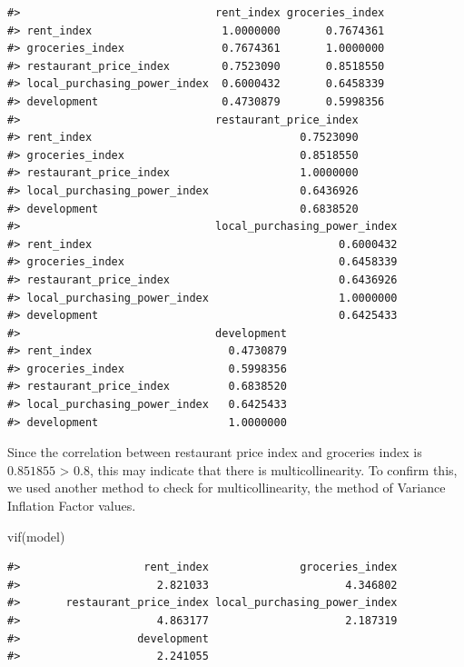 \documentclass[
  11pt,
  a4paper,
  twoside]{scrbook}
\newenvironment{Shaded}{\begin{snugshade}}{\end{snugshade}}
\newcommand{\FunctionTok}[1]{\textcolor[rgb]{0.00,0.00,0.00}{#1}}
\newcommand{\NormalTok}[1]{#1}
\begin{document}
\begin{verbatim}
#>                              rent_index groceries_index
#> rent_index                    1.0000000       0.7674361
#> groceries_index               0.7674361       1.0000000
#> restaurant_price_index        0.7523090       0.8518550
#> local_purchasing_power_index  0.6000432       0.6458339
#> development                   0.4730879       0.5998356
#>                              restaurant_price_index
#> rent_index                                0.7523090
#> groceries_index                           0.8518550
#> restaurant_price_index                    1.0000000
#> local_purchasing_power_index              0.6436926
#> development                               0.6838520
#>                              local_purchasing_power_index
#> rent_index                                      0.6000432
#> groceries_index                                 0.6458339
#> restaurant_price_index                          0.6436926
#> local_purchasing_power_index                    1.0000000
#> development                                     0.6425433
#>                              development
#> rent_index                     0.4730879
#> groceries_index                0.5998356
#> restaurant_price_index         0.6838520
#> local_purchasing_power_index   0.6425433
#> development                    1.0000000
\end{verbatim}

Since the correlation between restaurant price index and groceries index is
\(0.851855\) \textgreater{} 0.8, this may indicate that there is multicollinearity. To confirm this, we used another method to check for multicollinearity, the method of Variance Inflation Factor values.

\linespread{1}

\begin{Shaded}
\begin{Highlighting}[]
\FunctionTok{vif}\NormalTok{(model)}
\end{Highlighting}
\end{Shaded}

\linespread{1}

\begin{verbatim}
#>                   rent_index              groceries_index 
#>                     2.821033                     4.346802 
#>       restaurant_price_index local_purchasing_power_index 
#>                     4.863177                     2.187319 
#>                  development 
#>                     2.241055
\end{verbatim}
\end{document}
